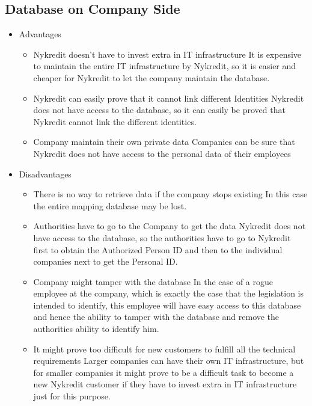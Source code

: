 \subsection{Database on Company Side}
\begin{itemize}
\item Advantages
\begin{itemize}
\item Nykredit doesn’t have to invest extra in IT infrastructure
It is expensive to maintain the entire IT infrastructure by Nykredit, so it is easier and cheaper for Nykredit to let the company maintain the database.
\item Nykredit can easily prove that it cannot link different Identities
Nykredit does not have access to the database, so it can easily be proved that Nykredit cannot link the different identities.
\item Company maintain their own private data
Companies can be sure that Nykredit does not have access to the personal data of their employees
\end{itemize}
\end{itemize}
\begin{itemize}
\item Disadvantages
\begin{itemize}
\item There is no way to retrieve data if the company stops existing
In this case the entire mapping database may be lost.
\item Authorities have to go to the Company to get the data
Nykredit does not have access to the database, so the authorities have to go to Nykredit first to obtain the Authorized Person ID and then to the individual companies next to get the Personal ID.
\item Company might tamper with the database
In the case of a rogue employee at the company, which is exactly the case that the legislation is intended to identify, this employee will have easy access to this database and hence the ability to tamper with the database and remove the authorities ability to identify him.
\item It might prove too difficult for new customers to fulfill all the technical requirements 
Larger companies can have their own IT infrastructure, but for smaller companies it might prove to be a difficult task to become a new Nykredit customer if they have to invest extra in IT infrastructure just for this purpose.
\end{itemize}
\end{itemize}
